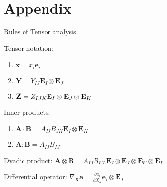 \appendix
\chapter*{Appendix}

\noindent Rules of Tensor analysis. \newline 

Tensor notation:
\begin{enumerate}
\item $\mathbf{x} = x_i \mathbf{e}_i$
\item $\mathbf{Y} = Y_{IJ} \mathbf{E}_I \otimes \mathbf{E}_J$
\item $\textbf{\begin{large}Z\end{large}} = Z_{IJK} \mathbf{E}_I \otimes \mathbf{E}_J \otimes \mathbf{E}_K$
\end{enumerate}

Inner products:
\begin{enumerate}
\item $\mathbf{A} \cdot \mathbf{B} = A_{IJ} B_{JK} \mathbf{E}_I \otimes \mathbf{E}_K$
\item $\mathbf{A} \colon \mathbf{B} = A_{IJ} B_{IJ}$
\end{enumerate}

Dyadic product:
$\mathbf{A} \otimes \mathbf{B} = A_{IJ} B_{KL} \mathbf{E}_I \otimes \mathbf{E}_J \otimes \mathbf{E}_K \otimes \mathbf{E}_L$ \newline

Differential operator:
$\nabla_{\mathbf{X}} \mathbf{a} = \frac{\partial a_i}{\partial X_J} \mathbf{e}_i \otimes \mathbf{E}_J$

